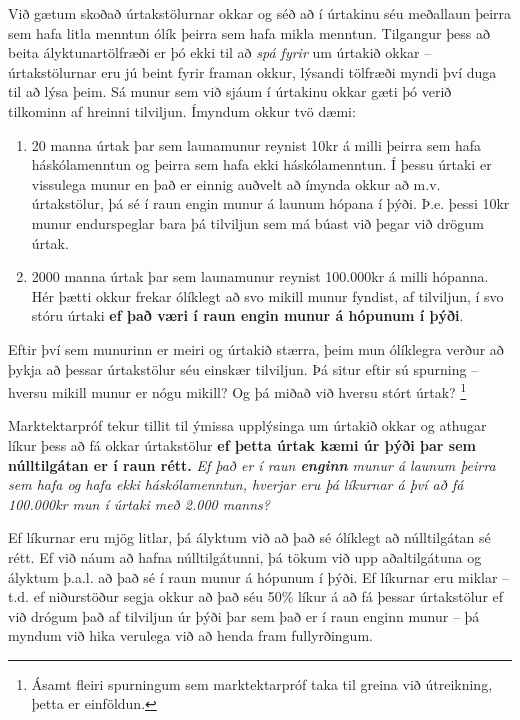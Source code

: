 \documentclass[
]{book}
\providecommand{\tightlist}{%
  \setlength{\itemsep}{0pt}\setlength{\parskip}{0pt}}
\begin{document}
Við gætum skoðað úrtakstölurnar okkar og séð að í úrtakinu séu meðallaun þeirra sem hafa litla menntun ólík þeirra sem hafa mikla menntun. Tilgangur þess að beita ályktunartölfræði er þó ekki til að \emph{spá fyrir} um úrtakið okkar -- úrtakstölurnar eru jú beint fyrir framan okkur, lýsandi tölfræði myndi því duga til að lýsa þeim. Sá munur sem við sjáum í úrtakinu okkar gæti þó verið tilkominn af hreinni tilviljun. Ímyndum okkur tvö dæmi:

\begin{enumerate}
\def\labelenumi{\arabic{enumi}.}
\tightlist
\item
  20 manna úrtak þar sem launamunur reynist 10kr á milli þeirra sem hafa háskólamenntun og þeirra sem hafa ekki háskólamenntun. Í þessu úrtaki er vissulega munur en það er einnig auðvelt að ímynda okkur að m.v. úrtakstölur, þá sé í raun engin munur á launum hópana í þýði. Þ.e. þessi 10kr munur endurspeglar bara þá tilviljun sem má búast við þegar við drögum úrtak.
\item
  2000 manna úrtak þar sem launamunur reynist 100.000kr á milli hópanna. Hér þætti okkur frekar ólíklegt að svo mikill munur fyndist, af tilviljun, í svo stóru úrtaki \textbf{ef það væri í raun engin munur á hópunum í þýði}.
\end{enumerate}

Eftir því sem munurinn er meiri og úrtakið stærra, þeim mun ólíklegra verður að þykja að þessar úrtakstölur séu einskær tilviljun. Þá situr eftir sú spurning -- hversu mikill munur er nógu mikill? Og þá miðað við hversu stórt úrtak? \footnote{Ásamt fleiri spurningum sem marktektarpróf taka til greina við útreikning, þetta er einföldun.}

Marktektarpróf tekur tillit til ýmissa upplýsinga um úrtakið okkar og athugar líkur þess að fá okkar úrtakstölur \textbf{ef þetta úrtak kæmi úr þýði þar sem núlltilgátan er í raun rétt.} \emph{Ef það er í raun \textbf{enginn} munur á launum þeirra sem hafa og hafa ekki háskólamenntun, hverjar eru þá líkurnar á því að fá 100.000kr mun í úrtaki með 2.000 manns?}

Ef líkurnar eru mjög litlar, þá ályktum við að það sé ólíklegt að núlltilgátan sé rétt. Ef við náum að hafna núlltilgátunni, þá tökum við upp aðaltilgátuna og ályktum þ.a.l. að það sé í raun munur á hópunum í þýði. Ef líkurnar eru miklar -- t.d. ef niðurstöður segja okkur að það séu 50\% líkur á að fá þessar úrtakstölur ef við drógum það af tilviljun úr þýði þar sem það er í raun enginn munur -- þá myndum við hika verulega við að henda fram fullyrðingum.
\end{document}
